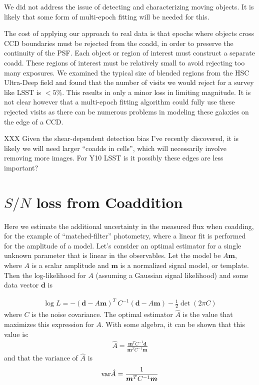 \documentclass[fleqn,useAMS,usenatbib]{mnras}
\begin{document}
We did not address the issue of detecting and characterizing moving objects.
It is likely that some form of multi-epoch fitting will be needed for this.

The cost of applying our approach to real data is that epochs where objects
cross CCD boundaries must be rejected from the coadd, in order to preserve the
continuity of the PSF.  Each object or region of interest must construct a
separate coadd.  These regions of interest must be relatively small to avoid
rejecting too many exposures.  We examined the typical size of blended regions
from the HSC Ultra-Deep field and found that the number of visits we would
reject for a survey like LSST is $< 5\%$.  This results in only a minor loss in
limiting magnitude.  It is not clear however that a multi-epoch fitting
algorithm could fully use these rejected visits as there can be numerous
problems in modeling these galaxies on the edge of a CCD.

XXX Given the shear-dependent detection bias I've recently discovered, it is
likely we will need larger ``coadds in cells'', which will necessarily involve
removing more images.  For Y10 LSST is it possibly these edges are less important?




\section{$S/N$ loss from Coaddition} 
\label{Section:FluxSN}
Here we estimate the additional uncertainty in the measured flux when coadding,
for the example of ``matched-filter'' photometry, where a linear fit is 
performed
for the amplitude of a model.
Let's consider an optimal estimator for a single unknown parameter that is
linear in the observables. Let the model be $A\boldsymbol{m}$, where $A$ is a
scalar amplitude and $\boldsymbol{m}$ is a normalized signal model, or
template. Then the log-likelihood for $A$ (assuming a Gaussian signal
likelihood) and some data vector $\boldsymbol{d}$ is

\begin{align}
\log L = - (\boldsymbol{d} - A\boldsymbol{m})^T\: C^{-1} (\boldsymbol{d} - 
A\boldsymbol{m}) - \frac{1}{2} \det(2\pi C )
\end{align}
where $C$ is the noise covariance.  The optimal estimator $\hat{A}$ is the
value that maximizes this expression for $A$. With some algebra, it can be
shown that this value is:
\begin{align}
\hat{A} = \frac{\boldsymbol{m}^T C^{-1} \boldsymbol{d}}{\boldsymbol{m}^T C^{-1} 
\boldsymbol{m}}
\end{align}
and that the variance of $\hat{A}$ is
\begin{align}
{\rm var}\hat{A} = \frac{1}{{\boldsymbol{m}^T C^{-1} \boldsymbol{m}}}
\end{align}
\end{document}
